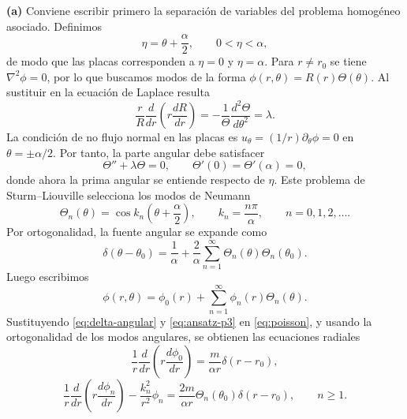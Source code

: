 \documentclass[11pt]{article}
\newcommand{\inciso}[1]{\vspace{0.35em}\noindent\textbf{(#1)}\enspace}
\begin{document}
\inciso{a} Conviene escribir primero la separación de variables del problema homogéneo asociado. Definimos
\begin{equation}
\eta=\theta+\frac{\alpha}{2},
\qquad 0<\eta<\alpha,
\label{eq:eta}
\end{equation}
de modo que las placas corresponden a $\eta=0$ y $\eta=\alpha$. Para $r\ne r_0$ se tiene $\nabla^2\phi=0$, por lo que buscamos modos de la forma $\phi(r,\theta)=R(r)\Theta(\theta)$. Al sustituir en la ecuación de Laplace resulta
\begin{equation}
\frac{r}{R}\frac{d}{dr}\left(r\frac{dR}{dr}\right)
=-\frac1\Theta\frac{d^2\Theta}{d\theta^2}=\lambda.
\label{eq:sep-p3}
\end{equation}
La condición de no flujo normal en las placas es $u_\theta=(1/r)\partial_\theta\phi=0$ en $\theta=\pm\alpha/2$. Por tanto, la parte angular debe satisfacer
\begin{equation}
\Theta''+\lambda\Theta=0,
\qquad
\Theta'(0)=\Theta'(\alpha)=0,
\label{eq:angular-neumann-p3}
\end{equation}
donde ahora la prima angular se entiende respecto de $\eta$. Este problema de Sturm--Liouville selecciona los modos de Neumann
\begin{equation}
\Theta_n(\theta)=\cos k_n\left(\theta+\frac{\alpha}{2}\right),
\qquad
k_n=\frac{n\pi}{\alpha},
\qquad n=0,1,2,\ldots.
\label{eq:modos-angulares}
\end{equation}
Por ortogonalidad, la fuente angular se expande como
\begin{equation}
\delta(\theta-\theta_0)=\frac1\alpha
+\frac2\alpha\sum_{n=1}^{\infty}\Theta_n(\theta)\Theta_n(\theta_0).
\label{eq:delta-angular}
\end{equation}
Luego escribimos
\begin{equation}
\phi(r,\theta)=\phi_0(r)+\sum_{n=1}^{\infty}\phi_n(r)\Theta_n(\theta).
\label{eq:ansatz-p3}
\end{equation}
Sustituyendo \eqref{eq:delta-angular} y \eqref{eq:ansatz-p3} en \eqref{eq:poisson}, y usando la ortogonalidad de los modos angulares, se obtienen las ecuaciones radiales
\begin{equation}
\frac1r\frac{d}{dr}\left(r\frac{d\phi_0}{dr}\right)
=\frac{m}{\alpha r}\delta(r-r_0),
\label{eq:radial-cero-p3}
\end{equation}
\begin{equation}
\frac1r\frac{d}{dr}\left(r\frac{d\phi_n}{dr}\right)-\frac{k_n^2}{r^2}\phi_n
=\frac{2m}{\alpha r}\Theta_n(\theta_0)\delta(r-r_0),
\qquad n\ge1.
\label{eq:radiales}
\end{equation}
\end{document}
